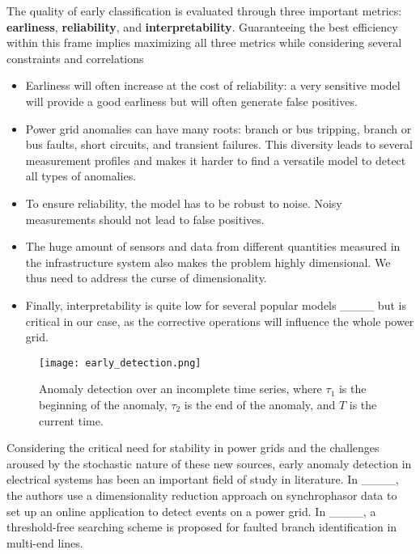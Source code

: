 The quality of early classification is evaluated through three important metrics:  \textbf{earliness}, \textbf{reliability}, and \textbf{interpretability}. Guaranteeing the best efficiency within this frame implies maximizing all three metrics while considering several constraints and correlations
\begin{itemize}
    \item Earliness will often increase at the cost of reliability: a very sensitive model will provide a good earliness but will often generate false positives.
    \item Power grid anomalies can have many roots: branch or bus tripping, branch or bus faults, short circuits, and transient failures. This diversity leads to several measurement profiles and makes it harder to find a versatile model to detect all types of anomalies.
    \item To ensure reliability, the model has to be robust to noise. Noisy measurements should not lead to false positives.
    \item The huge amount of sensors and data from different quantities measured in the infrastructure system also makes the problem highly dimensional. We thus need to address the curse of dimensionality.
    \item Finally, interpretability is quite low for several popular models ____ but is critical in our case, as the corrective operations will influence the whole power grid.
\end{itemize}

\begin{figure}[t]
	\centering
    \texttt{[image: early\_detection.png]}
	\caption{Anomaly detection over an incomplete time series, where $\tau_1$ is the beginning of the anomaly, $\tau_2$ is the end of the anomaly, and $T$ is the current time.}
	\label{fig:early_detection}
\end{figure}

Considering the critical need for stability in power grids and the challenges aroused by the stochastic nature of these new sources, early anomaly detection in electrical systems has been an important field of study in literature. In ____, the authors use a dimensionality reduction approach on synchrophasor data to set up an online application to detect events on a power grid. In ____, a threshold-free searching scheme is proposed for faulted branch identification in multi-end lines. 

